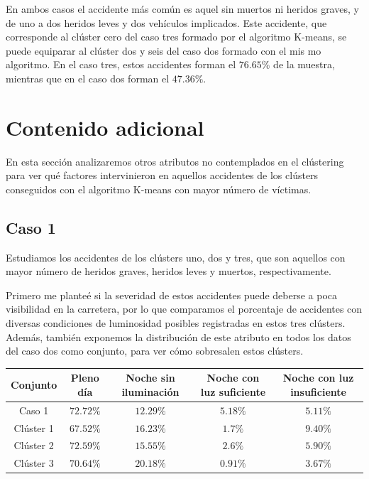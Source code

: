 \documentclass[a4]{article}
\begin{document}
En ambos casos el accidente más común es aquel sin muertos ni heridos graves, y de uno a dos heridos leves y dos vehículos implicados. Este accidente, que corresponde al clúster cero del caso tres formado por el algoritmo K-means, se puede equiparar al clúster dos y seis del caso dos formado con el mis mo algoritmo. En el caso tres, estos accidentes forman el $76.65\%$ de la muestra, mientras que en el caso dos forman el $47.36\%$. 

\newpage
\section{Contenido adicional}

En esta sección analizaremos otros atributos no contemplados en el clústering para ver qué factores intervinieron en aquellos accidentes de los clústers conseguidos con el algoritmo K-means con mayor número de víctimas.

\subsection{Caso 1}

Estudiamos los accidentes de los clústers uno, dos y tres, que son aquellos con mayor número de heridos graves, heridos leves y muertos, respectivamente. 

Primero me planteé si la severidad de estos accidentes puede deberse a poca visibilidad en la carretera, por lo que comparamos el porcentaje de accidentes con diversas condiciones de luminosidad posibles registradas en estos tres clústers. Además, también exponemos la distribución de este atributo en todos los datos del caso dos como conjunto, para ver cómo sobresalen estos clústers.

\begin{center}
\begin{tabular}{|c|c|c|c|c|}
\hline
  \multicolumn{1}{|c|}{\textbf{Conjunto}} & \textbf{Pleno día} & \textbf{Noche sin iluminación} &  \textbf{Noche con luz suficiente} & \textbf{Noche con luz insuficiente}\\ \hline
  Caso 1    & $72.72\%$ & $12.29\%$ & $5.18\%$ & $5.11\%$ \\ \hline
  Clúster 1 & $67.52\%$ & $16.23\%$ & $1.7 \%$ & $9.40\%$ \\ \hline
  Clúster 2 & $72.59\%$ & $15.55\%$ & $2.6 \%$ & $5.90\%$ \\ \hline
  Clúster 3 & $70.64\%$ & $20.18\%$ & $0.91\%$ & $3.67\%$ \\ \hline
\end{tabular}
\end{center}
\end{document}
